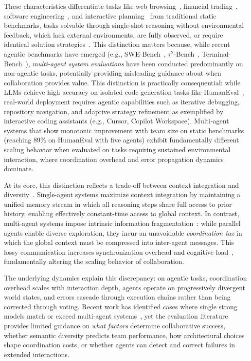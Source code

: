 These characteristics differentiate tasks like web browsing~\citep{wei2025browsecomp}, financial trading~\citep{yu2025finmem}, software engineering~\citep{jimenez2023swe}, and interactive planning~\citep{dagan2024plancraft} from traditional static benchmarks, tasks solvable through single-shot reasoning without environmental feedback, which lack external environments, are fully observed, or require identical solution strategies~\citep{liu2023agentbench,kapoor2024agents}. This distinction matters because, while recent agentic benchmarks have emerged (e.g., SWE-Bench~\citep{jimenez2023swe}, $\tau^2$-Bench~\citep{barres2025t2bench}, Terminal-Bench~\citep{merrill2026terminal}), \textit{multi-agent system evaluations} have been conducted predominantly on non-agentic tasks, potentially providing misleading guidance about when collaboration provides value. This distinction is practically consequential: while LLMs achieve high accuracy on isolated code generation tasks like HumanEval~\citep{chen2021humaneval}, real-world deployment requires agentic capabilities such as iterative debugging, repository navigation, and adaptive strategy refinement as exemplified by interactive coding assistants (e.g., Cursor, Copilot Workspace). Multi-agent systems that show monotonic improvement with team size on static benchmarks (reaching 89\% on HumanEval with five agents) exhibit fundamentally different scaling behavior when evaluated on tasks requiring sustained environmental interaction, where coordination overhead and error propagation dynamics dominate. 

At its core, this distinction reflects a trade-off between context integration and diversity~\citep{du2023improving, hong2024metagpt}. Single-agent systems maximize context integration by maintaining a unified memory stream in which all reasoning steps share full access to prior history, enabling effectively constant-time access to global context. In contrast, multi-agent systems impose intrinsic information fragmentation~\citep{tran2025multiagent}: while parallel agents enable diverse exploration, they incur an unavoidable \textit{coordination tax} in which the global context must be compressed into inter-agent messages. This lossy communication increases synchronization overhead and cognitive load~\citep{malone1994interdisciplinary}, fundamentally altering the scaling behavior of collaboration.

The underlying dynamics explain this discrepancy: on agentic tasks, coordination overhead scales with interaction depth, agents operate on progressively divergent world states, and errors cascade through execution chains rather than being corrected through voting. Recent work has identified cases where single strong models match or exceed multi-agent systems~\citep{gao2025single}, yet the evaluation literature provides limited guidance on \textit{what factors} determine collaborative success, whether semantic diversity predicts team performance, how architectural choices shape coordination costs, or whether agents can detect and correct failures in extended interactions.

